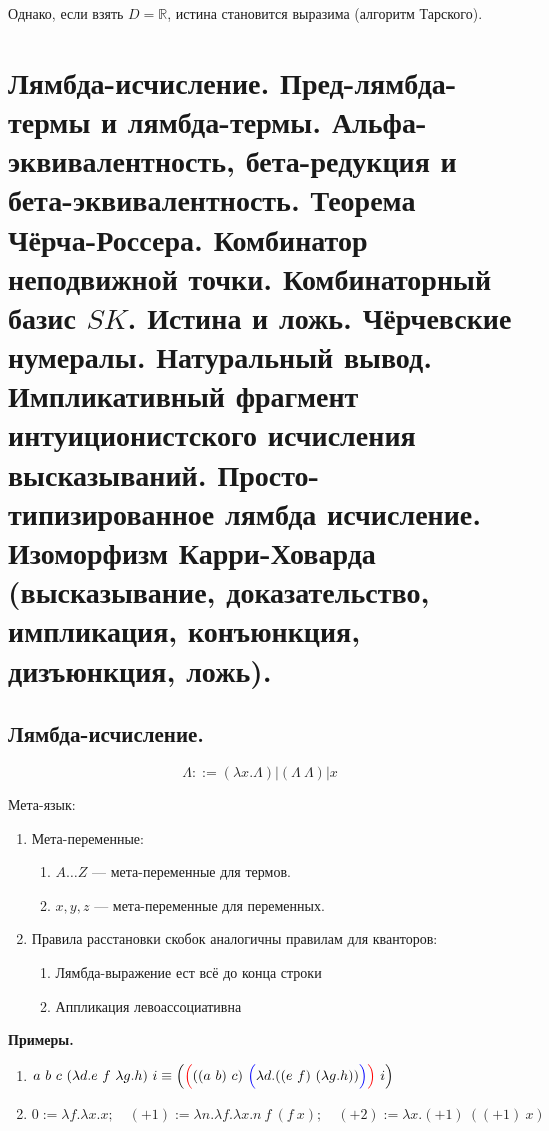 \documentclass[10pt,a4paper,oneside]{article}
\begin{document}
\noindent Однако, если взять $D = \mathbb{R}$, истина становится выразима (алгоритм Тарского).

\section{ Лямбда-исчисление. Пред-лямбда-термы и лямбда-термы. Альфа-эквивалентность, бета-редукция
и бета-эквивалентность. Теорема Чёрча-Россера. 
Комбинатор неподвижной точки. Комбинаторный базис $SK$.
Истина и ложь. Чёрчевские нумералы. 
Натуральный вывод. Импликативный фрагмент интуиционистского исчисления высказываний.
Просто-типизированное лямбда исчисление. Изоморфизм Карри-Ховарда (высказывание, доказательство, импликация, конъюнкция, дизъюнкция, ложь).}

\subsection{Лямбда-исчисление.}
$$\Lambda ::= (\lambda x.\Lambda) | (\Lambda\ \Lambda) | x$$

Мета-язык: 
\begin{enumerate}
\item Мета-переменные:\begin{enumerate}
\item $A\dots Z$ --- мета-переменные для термов. 
\item $x,y,z$ --- мета-переменные для переменных. 
\end{enumerate}

\item Правила расстановки скобок аналогичны правилам для кванторов:
\begin{enumerate}
\item Лямбда-выражение ест всё до конца строки
\item Аппликация левоассоциативна
\end{enumerate}
\end{enumerate}

{\bf Примеры.}
\begin{enumerate}
\item $a\ b\ c\ (\lambda d.e\ f\ \lambda g.h)\ i \equiv \Big({\color{red}\Big(}((a\ b)\ c)\ {\color{blue}\Big(}\lambda d.((e\ f)\ (\lambda g.h)){\color{blue}\Big)}{\color{red}\Big)}\ i\Big)$
\item $0 := \lambda f.\lambda x.x;\quad(+1) := \lambda n.\lambda f.\lambda x.n\ f\ (f\ x);\quad(+2) := \lambda x.(+1)\ ((+1)\ x)$
\end{enumerate}
\end{document}
